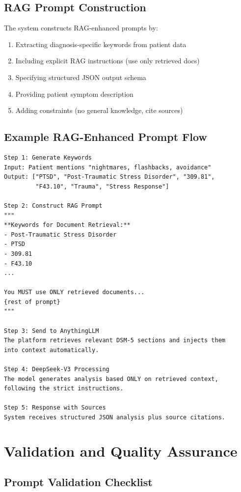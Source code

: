 \documentclass[sigconf,review,anonymous]{acmart}
\begin{document}
\subsection{RAG Prompt Construction}

The system constructs RAG-enhanced prompts by:

\begin{enumerate}
\item Extracting diagnosis-specific keywords from patient data
\item Including explicit RAG instructions (use only retrieved docs)
\item Specifying structured JSON output schema
\item Providing patient symptom description
\item Adding constraints (no general knowledge, cite sources)
\end{enumerate}

\subsection{Example RAG-Enhanced Prompt Flow}

\begin{lstlisting}
Step 1: Generate Keywords
Input: Patient mentions "nightmares, flashbacks, avoidance"
Output: ["PTSD", "Post-Traumatic Stress Disorder", "309.81", 
         "F43.10", "Trauma", "Stress Response"]

Step 2: Construct RAG Prompt
"""
**Keywords for Document Retrieval:**
- Post-Traumatic Stress Disorder
- PTSD
- 309.81
- F43.10
...

You MUST use ONLY retrieved documents...
{rest of prompt}
"""

Step 3: Send to AnythingLLM
The platform retrieves relevant DSM-5 sections and injects them 
into context automatically.

Step 4: DeepSeek-V3 Processing
The model generates analysis based ONLY on retrieved context, 
following the strict instructions.

Step 5: Response with Sources
System receives structured JSON analysis plus source citations.
\end{lstlisting}

\section{Validation and Quality Assurance}

\subsection{Prompt Validation Checklist}
\end{document}
